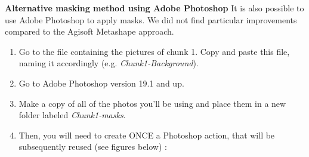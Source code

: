 \documentclass[10pt,letter,english]{article}
\begin{document}
\bigskip
\noindent \textbf{Alternative masking method using Adobe Photoshop}
It is also possible to use Adobe Photoshop to apply masks. We did not find particular improvements compared to the Agisoft Metashape approach.
    \begin{enumerate}
        \item Go to the file containing the pictures of chunk 1. Copy and paste this file, naming it accordingly (e.g. \textit{Chunk1-Background}).
        \item Go to Adobe Photoshop version 19.1 and up.
        \item Make a copy of all of the photos you’ll be using and place them in a new folder labeled \textit{Chunk1-masks}.
        \item Then, you will need to create ONCE a Photoshop action, that will be subsequently reused (see figures below) :
        




\end{enumerate}
\end{document}
